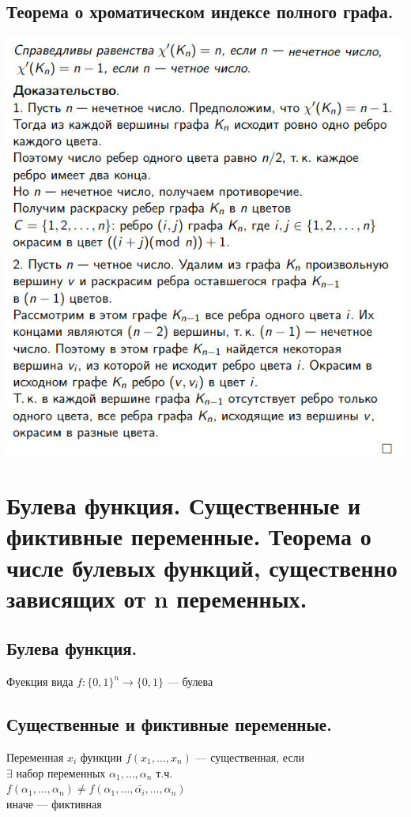 \documentclass[12pt]{article}
\begin{document}
\subsection{Теорема о хроматическом индексе полного графа.}
	\includegraphics[width=400pt]{13}

\section{Булева функция. Существенные и фиктивные переменные. Теорема о числе булевых функций, существенно зависящих от n переменных.}
\subsection{Булева функция.}
	Фуекция вида $f: \{0,1\}^n \to \{0,1\}$ — булева
\subsection{Существенные и фиктивные переменные.}
	Переменная $x_i$ функции $f(x_1,\dotsc,x_n)$ — существенная, если $\exists \text{ набор переменных } \alpha_1,\dotsc,\alpha_n$ т.ч.\\ $f(\alpha_1,\dotsc,\alpha_n) \neq f(\alpha_1,\dotsc,\bar{\alpha_i},\dotsc,\alpha_n)$\\
	иначе — фиктивная
\end{document}
